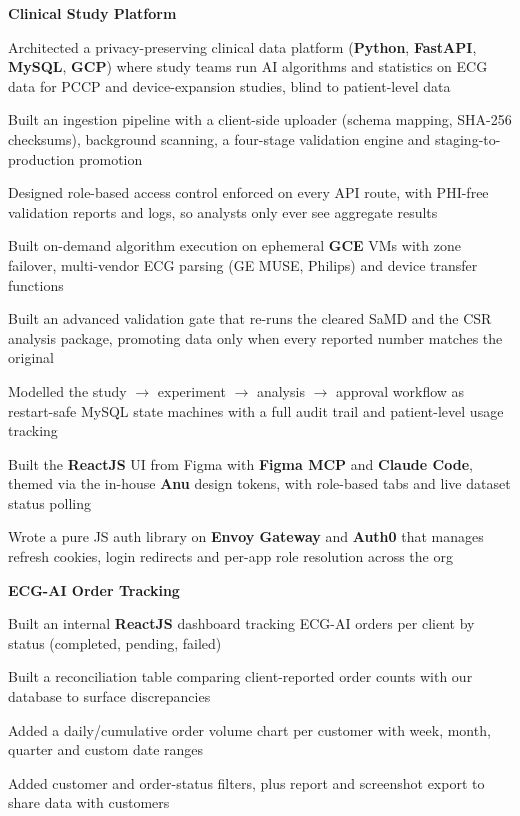 \documentclass[]{resume-openfont}
\newcommand{\projectTitle}[1]{\par\vspace{2pt}\noindent\textbf{#1}\par}
\begin{document}
\projectTitle{Clinical Study Platform}

\begin{bullets}
    \item Architected a privacy-preserving clinical data platform (\textbf{Python}, \textbf{FastAPI}, \textbf{MySQL}, \textbf{GCP}) where study teams run AI algorithms and statistics on ECG data for PCCP and device-expansion studies, blind to patient-level data
    \item Built an ingestion pipeline with a client-side uploader (schema mapping, SHA-256 checksums), background scanning, a four-stage validation engine and staging-to-production promotion
    \item Designed role-based access control enforced on every API route, with PHI-free validation reports and logs, so analysts only ever see aggregate results
    \item Built on-demand algorithm execution on ephemeral \textbf{GCE} VMs with zone failover, multi-vendor ECG parsing (GE MUSE, Philips) and device transfer functions
    \item Built an advanced validation gate that re-runs the cleared SaMD and the CSR analysis package, promoting data only when every reported number matches the original
    \item Modelled the study $\rightarrow$ experiment $\rightarrow$ analysis $\rightarrow$ approval workflow as restart-safe MySQL state machines with a full audit trail and patient-level usage tracking
    \item Built the \textbf{ReactJS} UI from Figma with \textbf{Figma MCP} and \textbf{Claude Code}, themed via the in-house \textbf{Anu} design tokens, with role-based tabs and live dataset status polling
    \item Wrote a pure JS auth library on \textbf{Envoy Gateway} and \textbf{Auth0} that manages refresh cookies, login redirects and per-app role resolution across the org
\end{bullets}

\projectTitle{ECG-AI Order Tracking}

\begin{bullets}
    \item Built an internal \textbf{ReactJS} dashboard tracking ECG-AI orders per client by status (completed, pending, failed)
    \item Built a reconciliation table comparing client-reported order counts with our database to surface discrepancies
    \item Added a daily/cumulative order volume chart per customer with week, month, quarter and custom date ranges
    \item Added customer and order-status filters, plus report and screenshot export to share data with customers
\end{bullets}
\end{document}
